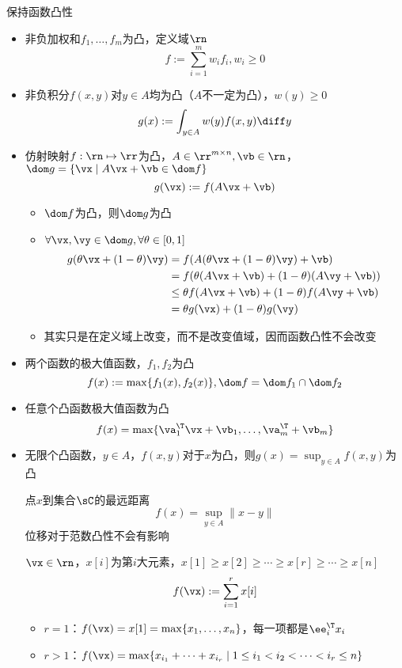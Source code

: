 保持函数凸性
\begin{itemize}
	\item 非负加权和$f_1,\ldots,f_m$为凸，定义域$\rn$
	\[f:=\sum_{i=1}^m w_if_i,w_i\geq 0\]
	\item 非负积分$f(x,y)$对$y\in A$均为凸（$A$不一定为凸），$w(y)\geq 0$
	\[g(x):=\int_{y\in A}w(y)f(x,y)\diff y\]
	\item 仿射映射$f:\rn\mapsto\rr$为凸，$A\in\rr^{m\times n},\vb\in\rn$，$\dom g=\{\vx\mid A\vx+\vb\in\dom f\}$
	\[g(\vx):=f(A\vx+\vb)\]
	\begin{analysis}
	\begin{itemize}
		\item $\dom f$为凸，则$\dom g$为凸
		\item $\forall \vx,\vy\in\dom g,\forall\theta\in[0,1]$
		\[\begin{aligned}
		g(\theta \vx+(1-\theta)\vy)&=f(A(\theta \vx+(1-\theta)\vy)+\vb)\\
		&=f(\theta(A\vx+\vb)+(1-\theta)(A\vy+\vb))\\
		&\leq\theta f(A\vx+\vb)+(1-\theta)f(A\vy+\vb)\\
		&=\theta g(\vx)+(1-\theta)g(\vy)
		\end{aligned}\]
		\item 其实只是在定义域上改变，而不是改变值域，因而函数凸性不会改变
	\end{itemize}
	\end{analysis}
	\item 两个函数的极大值函数，$f_1,f_2$为凸
	\[f(x):=\max\{f_1(x),f_2(x)\},\dom f=\dom f_1\cap\dom f_2\]
	\item 任意个凸函数极大值函数为凸
	\[f(x)=\max\{\va_1^\T \vx+\vb_1,\ldots,\va_m^\T+\vb_m\}\]
	\item 无限个凸函数，$y\in A$，$f(x,y)$对于$x$为凸，则$g(x)=\sup_{y\in A} f(x,y)$为凸
	\begin{example}
	点$x$到集合$\sC$的最远距离
	\[f(x)=\sup_{y\in A}\|x-y\|\]
	位移对于范数凸性不会有影响
	\end{example}
	\begin{example}
	$\vx\in\rn$，$x[i]$为第$i$大元素，$x[1]\geq x[2]\geq\cdots\geq x[r]\geq\cdots\geq x[n]$
	\[f(\vx):=\sum_{i=1}^r x[i]\]
	\begin{itemize}
	\item $r=1$：$f(\vx)=x[1]=\max\{x_1,\ldots,x_n\}$，每一项都是$\ee_i^\T x_i$
	\item $r>1$：$f(\vx)=\max\{x_{i_1}+\cdots+x_{i_r}\mid 1\leq i_1<i_2<\cdots<i_r\leq n\}$
	\end{itemize}

\end{example}
\end{itemize}
